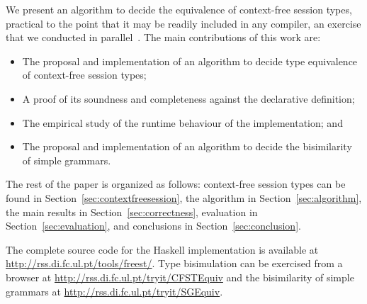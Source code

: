 

We present an algorithm to decide the equivalence of context-free
session types, practical to the point that it may be readily included
in any compiler, an exercise that we conducted in
parallel~\cite{almeida.etal_freest-functional-language}.
%
The main contributions of this work are:
%
\begin{itemize}
\item The proposal and implementation of an algorithm to decide type
  equivalence of context-free session types;
\item A proof of its soundness and completeness against the
  declarative definition;
\item The empirical study of the runtime behaviour of the
  implementation; and
\item The proposal and implementation of an algorithm to decide
  the bisimilarity of simple grammars.
\end{itemize}


The rest of the paper is organized as follows: context-free session
types can be found in Section~\ref{sec:contextfreesession}, the
algorithm in Section~\ref{sec:algorithm}, the main results in
Section~\ref{sec:correctness},
evaluation in Section~\ref{sec:evaluation}, and conclusions in
Section~\ref{sec:conclusion}.

The complete source code for the Haskell implementation is available
at \url{http://rss.di.fc.ul.pt/tools/freest/}.
%
Type bisimulation can be exercised from a browser at
\url{http://rss.di.fc.ul.pt/tryit/CFSTEquiv} and the bisimilarity of
simple grammars at \url{http://rss.di.fc.ul.pt/tryit/SGEquiv}.

